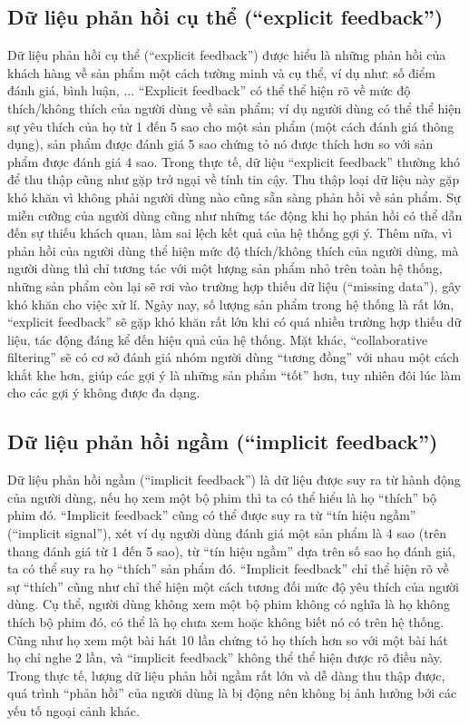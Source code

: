     \subsection{Dữ liệu phản hồi cụ thể (``explicit feedback'')}
    Dữ liệu phản hồi cụ thể (``explicit feedback'') được hiểu là những
    phản hồi của khách hàng về sản phẩm một cách tường minh và cụ thể, ví dụ như: số điểm đánh giá,
    bình luận, ... ``Explicit feedback'' có thể thể hiện rõ về mức độ thích/không thích của người dùng về sản phẩm;
    ví dụ người dùng có thể thể hiện sự yêu thích của họ từ 1 đến 5 sao cho một sản phẩm (một cách đánh giá thông dụng), 
    sản phẩm được đánh giá 5 sao chứng tỏ nó được thích hơn so với sản phẩm được đánh giá 4 sao. 
    Trong thực tế, dữ liệu ``explicit feedback'' thường khó để thu thập cũng như gặp trở ngại về tính tin cậy.
    Thu thập loại dữ liệu này gặp khó khăn vì không phải người dùng nào cũng sẵn sàng phản hồi về sản phẩm. 
    Sự miễn cưỡng của người dùng cũng như những tác động khi họ phản hồi có thể dẫn đến sự thiếu khách quan,
    làm sai lệch kết quả của hệ thống gợi ý. 
    Thêm nữa, vì phản hồi của người dùng thể hiện mức độ thích/không thích của người dùng, mà người dùng thì chỉ tương tác với
    một lượng sản phẩm nhỏ trên toàn hệ thống, những sản phẩm còn lại sẽ rơi vào trường hợp thiếu dữ liệu (``missing data''),
    gây khó khăn cho việc xử lí. 
    Ngày nay, số lượng sản phẩm trong hệ thống là rất lớn, ``explicit feedback'' sẽ gặp khó khăn rất lớn khi có quá nhiều trường hợp thiếu dữ liệu,
    tác động đáng kể đến hiệu quả của hệ thống. Mặt khác, ``collaborative filtering'' sẽ có cơ sở đánh giá nhóm người dùng ``tương đồng'' với nhau
    một cách khắt khe hơn, giúp các gợi ý là những sản phẩm ``tốt'' hơn, tuy nhiên đôi lúc làm cho các gợi ý không được đa dạng.

    \subsection{Dữ liệu phản hồi ngầm (``implicit feedback'')}
    Dữ liệu phản hồi ngầm (``implicit feedback'') là dữ liệu được suy ra từ hành động của người dùng, nếu họ xem một bộ phim
    thì ta có thể hiểu là họ ``thích'' bộ phim đó. ``Implicit feedback'' cũng có thể được suy ra từ ``tín hiệu ngầm'' (``implicit signal''),
    xét ví dụ người dùng đánh giá một sản phẩm là 4 sao (trên thang đánh giá từ 1 đến 5 sao), từ ``tín hiệu ngầm'' dựa trên số sao họ đánh giá,
    ta có thể suy ra họ ``thích'' sản phẩm đó. 
    ``Implicit feedback'' chỉ thể hiện rõ về sự ``thích'' cũng như chỉ thể hiện một cách tương đối mức độ yêu thích của người dùng.
    Cụ thể, người dùng không xem một bộ phim không có nghĩa là họ không thích bộ phim đó, có thể là họ chưa xem hoặc không biết nó có trên hệ thống.
    Cũng như họ xem một bài hát 10 lần chứng tỏ họ thích hơn so với một bài hát họ chỉ nghe 2 lần, 
    và ``implicit feedback'' không thể thể hiện được rõ điều này.
    Trong thực tế, lượng dữ liệu phản hồi ngầm rất lớn và dễ dàng thu thập được, quá trình ``phản hồi'' của người dùng là bị động
    nên không bị ảnh hưởng bởi các yếu tố ngoại cảnh khác. 

